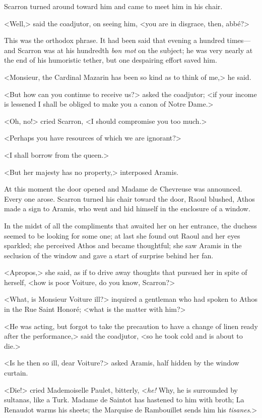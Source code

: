 Scarron turned around toward him and came to meet him in his chair.

<Well,> said the coadjutor, on seeing him, <you are in disgrace, then, abbé?>

This was the orthodox phrase. It had been said that evening a hundred times—and Scarron was at his hundredth \textit{bon mot} on the subject; he was very nearly at the end of his humoristic tether, but one despairing effort saved him.

<Monsieur, the Cardinal Mazarin has been so kind as to think of me,> he said.

<But how can you continue to receive us?> asked the coadjutor; <if your income is lessened I shall be obliged to make you a canon of Notre Dame.>

<Oh, no!> cried Scarron, <I should compromise you too much.>

<Perhaps you have resources of which we are ignorant?>

<I shall borrow from the queen.>

<But her majesty has no property,> interposed Aramis.

At this moment the door opened and Madame de Chevreuse was announced. Every one arose. Scarron turned his chair toward the door, Raoul blushed, Athos made a sign to Aramis, who went and hid himself in the enclosure of a window.

In the midst of all the compliments that awaited her on her entrance, the duchess seemed to be looking for some one; at last she found out Raoul and her eyes sparkled; she perceived Athos and became thoughtful; she saw Aramis in the seclusion of the window and gave a start of surprise behind her fan.

<Apropos,> she said, as if to drive away thoughts that pursued her in spite of herself, <how is poor Voiture, do you know, Scarron?>

<What, is Monsieur Voiture ill?> inquired a gentleman who had spoken to Athos in the Rue Saint Honoré; <what is the matter with him?>

<He was acting, but forgot to take the precaution to have a change of linen ready after the performance,> said the coadjutor, <so he took cold and is about to die.>

<Is he then so ill, dear Voiture?> asked Aramis, half hidden by the window curtain.

<Die!> cried Mademoiselle Paulet, bitterly, <\textit{he!} Why, he is surrounded by sultanas, like a Turk. Madame de Saintot has hastened to him with broth; La Renaudot warms his sheets; the Marquise de Rambouillet sends him his \textit{tisanes}.>

